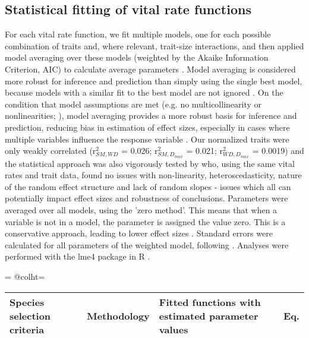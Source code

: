 \documentclass[b5paper,justified]{tufte-book} %
\begin{document}
\begin{fullwidth}
\subsection{Statistical fitting of vital rate functions}
For each vital rate function, we fit multiple models, one for each possible combination of traits and, where relevant, trait-size interactions, and then applied model averaging over these models (weighted by the Akaike Information Criterion, AIC) to calculate average parameters \citep{Burnham2002}. Model averaging is considered more robust for inference and prediction than simply using the single best model, because models with a similar fit to the best model are not ignored \citep{Burnham2002, Whittingham2006, Bolker2009}. On the condition that model assumptions are met (e.g. no multicollinearity or nonlinearities; \citealt{Cade2015}), model averaging provides a more robust basis for inference and prediction, reducing bias in estimation of effect sizes, especially in cases where multiple variables influence the response variable \citep{Grueber2011}. Our normalized traits were only weakly correlated (r$^2_{SM,WD}$ = 0.026; r$^2_{SM,D_{max}}$ = 0.021; r$^2_{WD,D_{max}}$ = 0.0019) and the statistical approach was also vigorously tested by \citet{Visser2016} who, using the same vital rates and trait data, found no issues with non-linearity, heteroscedasticity, nature of the random effect structure and lack of random slopes - issues which all can potentially impact effect sizes and robustness of conclusions. Parameters were averaged over all models, using the 'zero method'. This means that when a variable is not in a model, the parameter is assigned the value zero. This is a conservative approach, leading to lower effect sizes \citep{Burnham2002}. Standard errors were calculated for all parameters of the weighted model, following \citep{Buckland1997}. Analyses were performed with the lme4 package in R \citep{Bates2014, RDCT2016}.




\begin{landscape}
\advance{}
\textheight=\vsize
\csname @colht\endcsname=\vsize
\footnotesize
\setlength\LTleft{-.3cm}
\setlength\LTright{-2cm}
\begin{longtable}{@{}p{6cm}p{6cm}p{6cm}p{1cm}}
\hline
Species selection criteria & Methodology & Fitted functions with estimated parameter values & Eq. \\ 
\hline 

\hline

\endfirsthead
\hline


\end{longtable}
\end{landscape}
\end{fullwidth}
\end{document}

